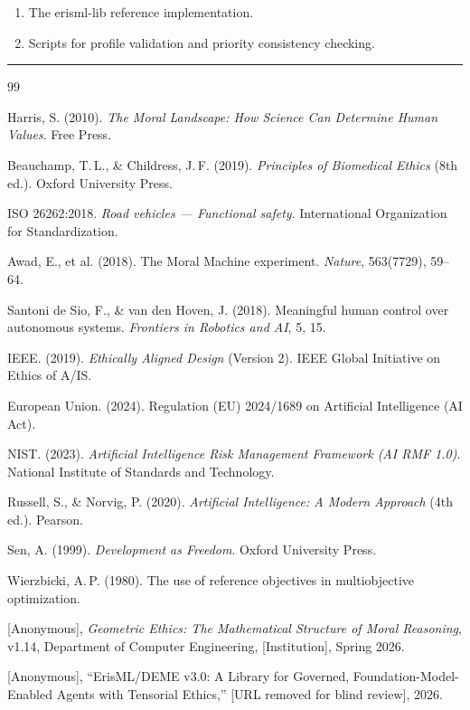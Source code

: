 \documentclass[11pt]{article}
\begin{document}
\begin{enumerate}
  \item The erisml-lib reference implementation.
  \item Scripts for profile validation and priority consistency checking.
\end{enumerate}

\hrule
\vspace{1em}

\begin{thebibliography}{99}

Harris, S. (2010). \emph{The Moral Landscape: How Science Can Determine Human Values}. Free Press.

Beauchamp, T.\,L., \& Childress, J.\,F. (2019). \emph{Principles of Biomedical Ethics} (8th ed.). Oxford University Press.

ISO 26262:2018. \emph{Road vehicles --- Functional safety}. International Organization for Standardization.

Awad, E., et al. (2018). The Moral Machine experiment. \emph{Nature}, 563(7729), 59--64.

Santoni de Sio, F., \& van den Hoven, J. (2018). Meaningful human control over autonomous systems. \emph{Frontiers in Robotics and AI}, 5, 15.

IEEE. (2019). \emph{Ethically Aligned Design} (Version 2). IEEE Global Initiative on Ethics of A/IS.

European Union. (2024). Regulation (EU) 2024/1689 on Artificial Intelligence (AI Act).

NIST. (2023). \emph{Artificial Intelligence Risk Management Framework (AI RMF 1.0)}. National Institute of Standards and Technology.

Russell, S., \& Norvig, P. (2020). \emph{Artificial Intelligence: A Modern Approach} (4th ed.). Pearson.

Sen, A. (1999). \emph{Development as Freedom}. Oxford University Press.

Wierzbicki, A.\,P. (1980). The use of reference objectives in multiobjective optimization.

[Anonymous], \emph{Geometric Ethics: The Mathematical Structure of Moral Reasoning}, v1.14, Department of Computer Engineering, [Institution], Spring 2026.

[Anonymous], ``ErisML/DEME v3.0: A Library for Governed, Foundation-Model-Enabled Agents with Tensorial Ethics,'' [URL removed for blind review], 2026.

\end{thebibliography}
\end{document}
